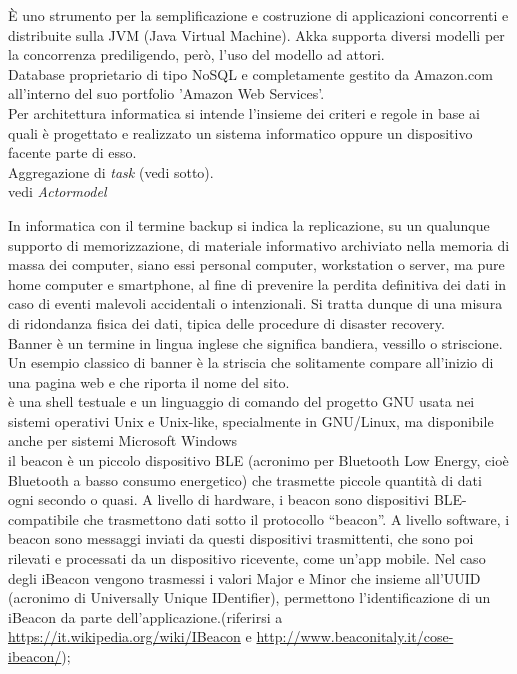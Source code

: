 \documentclass{scalatekids-article}
\begin{document}
 È uno strumento per la semplificazione e costruzione di applicazioni concorrenti e distribuite sulla JVM (Java Virtual Machine). Akka supporta diversi modelli per la concorrenza prediligendo, però, l'uso del modello ad attori.
\\

 Database proprietario di tipo NoSQL e completamente gestito da Amazon.com all'interno del suo portfolio 'Amazon Web Services'.
\\

 Per architettura informatica si intende l'insieme dei criteri e regole in base ai quali è progettato e realizzato un sistema informatico oppure un dispositivo facente parte di esso.
\\

 Aggregazione di \textit{task} (vedi sotto).
\\

 vedi \textit{Actormodel}
\\


 In informatica con il termine backup si indica la replicazione, su un qualunque supporto di memorizzazione, di materiale informativo archiviato nella memoria di massa dei computer, siano essi personal computer, workstation o server, ma pure home computer e smartphone, al fine di prevenire la perdita definitiva dei dati in caso di eventi malevoli accidentali o intenzionali. Si tratta dunque di una misura di ridondanza fisica dei dati, tipica delle procedure di disaster recovery.
\\

 Banner è un termine in lingua inglese che significa bandiera, vessillo o striscione. Un esempio classico di banner è la striscia che solitamente compare all'inizio di una pagina web e che riporta il nome del sito.
\\

 è una shell testuale e un linguaggio di comando del progetto GNU usata nei sistemi operativi Unix e Unix-like, specialmente in GNU/Linux, ma disponibile anche per sistemi Microsoft Windows
\\

 il beacon è un piccolo dispositivo BLE (acronimo per Bluetooth Low Energy, cioè Bluetooth a basso consumo energetico) che trasmette piccole quantità di dati ogni secondo o quasi.  A livello di hardware, i beacon sono dispositivi BLE-compatibile che trasmettono dati sotto il protocollo “beacon”.
A livello software, i beacon sono messaggi inviati da questi dispositivi trasmittenti, che sono poi rilevati e processati da un dispositivo ricevente, come un’app mobile. Nel caso degli iBeacon vengono trasmessi i valori Major e Minor che insieme all’UUID (acronimo di Universally Unique IDentifier), permettono l’identificazione di un iBeacon da parte dell’applicazione.(riferirsi a \url{https://it.wikipedia.org/wiki/IBeacon} e \url{http://www.beaconitaly.it/cose-ibeacon/});
\\
\end{document}
